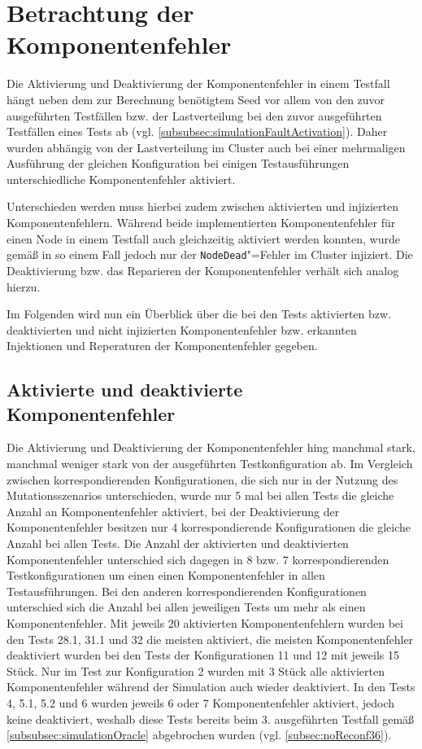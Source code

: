 \section{Betrachtung der Komponentenfehler}
\label{sec:faultEval}

Die Aktivierung und Deaktivierung der Komponentenfehler in einem Testfall hängt neben dem zur Berechnung benötigtem Seed vor allem von den zuvor ausgeführten Testfällen bzw. der Lastverteilung bei den zuvor ausgeführten Testfällen eines Tests ab (vgl. \autoref{subsubsec:simulationFaultActivation}).
Daher wurden abhängig von der Lastverteilung im Cluster auch bei einer mehrmaligen Ausführung der gleichen Konfiguration bei einigen Testausführungen unterschiedliche Komponentenfehler aktiviert.

Unterschieden werden muss hierbei zudem zwischen aktivierten und injizierten Komponentenfehlern.
Während beide implementierten Komponentenfehler für einen Node in einem Testfall auch gleichzeitig aktiviert werden konnten, wurde gemäß  in so einem Fall jedoch nur der \texttt{NodeDead}"=Fehler im Cluster injiziert.
Die Deaktivierung bzw. das Reparieren der Komponentenfehler verhält sich analog hierzu.

Im Folgenden wird nun ein Überblick über die bei den Tests aktivierten bzw. deaktivierten und nicht injizierten Komponentenfehler bzw. erkannten Injektionen und Reperaturen der Komponentenfehler gegeben.

\subsection{Aktivierte und deaktivierte Komponentenfehler}
\label{subsec:actDeactFaults}

Die Aktivierung und Deaktivierung der Komponentenfehler hing manchmal stark, manchmal weniger stark von der ausgeführten Testkonfiguration ab.
Im Vergleich zwischen korrespondierenden Konfigurationen, die sich nur in der Nutzung des Mutationsszenarios unterschieden, wurde nur 5 mal bei allen Tests die gleiche Anzahl an Komponentenfehler aktiviert, bei der Deaktivierung der Komponentenfehler besitzen nur 4 korrespondierende Konfigurationen die gleiche Anzahl bei allen Tests.
Die Anzahl der aktivierten und deaktivierten Komponentenfehler unterschied sich dagegen in 8 bzw. 7 korrespondierenden Testkonfigurationen um einen einen Komponentenfehler in allen Testausführungen.
Bei den anderen korrespondierenden Konfigurationen unterschied sich die Anzahl bei allen jeweiligen Tests um mehr als einen Komponentenfehler.
Mit jeweils 20 aktivierten Komponentenfehlern wurden bei den Tests 28.1, 31.1 und 32 die meisten aktiviert, die meisten Komponentenfehler deaktiviert wurden bei den Tests der Konfigurationen 11 und 12 mit jeweils 15 Stück.
Nur im Test zur Konfiguration 2 wurden mit 3 Stück alle aktivierten Komponentenfehler während der Simulation auch wieder deaktiviert.
In den Tests 4, 5.1, 5.2 und 6 wurden jeweils 6 oder 7 Komponentenfehler aktiviert, jedoch keine deaktiviert, weshalb diese Tests bereits beim 3. ausgeführten Testfall gemäß \autoref{subsubsec:simulationOracle} abgebrochen wurden (vgl. \autoref{subsec:noReconf36}).

